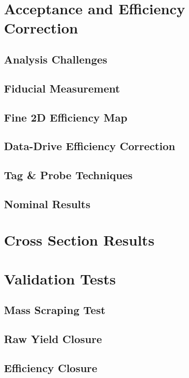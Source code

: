 \section{Acceptance and Efficiency Correction} 

\subsection{Analysis Challenges}

\subsection{Fiducial Measurement}

\subsection{Fine 2D Efficiency Map}

\subsection{Data-Drive Efficiency Correction}

\subsection{Tag \& Probe Techniques}

\subsection{Nominal Results}

\section{Cross Section Results} 

\section{Validation Tests} 

\subsection{Mass Scraping Test}

\subsection{Raw Yield Closure}

\subsection{Efficiency Closure}

